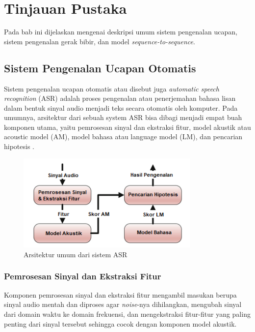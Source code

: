 \chapter{Tinjauan Pustaka}

Pada bab ini dijelaskan mengenai deskripsi umum sistem pengenalan ucapan, sistem pengenalan gerak bibir, dan model \textit{sequence-to-sequence}.

\section{Sistem Pengenalan Ucapan Otomatis}

Sistem pengenalan ucapan otomatis atau disebut juga \textit{automatic speech recognition} (ASR) adalah proses pengenalan atau penerjemahan bahasa lisan dalam bentuk sinyal audio menjadi teks secara otomatis oleh komputer. Pada umumnya, arsitektur dari sebuah system ASR bisa dibagi menjadi empat buah komponen utama, yaitu pemrosesan sinyal dan ekstraksi fitur, model akustik atau acoustic model (AM), model bahasa atau language model (LM), dan pencarian hipotesis \parencite{Yu2014}.

\begin{figure}[h]
    \centering
    \includegraphics[width=0.8\textwidth]{resources/images/arsitektur-umum-asr.png}
    \caption{Arsitektur umum dari sistem ASR \parencite{Yu2014}}
\end{figure}


\subsection{Pemrosesan Sinyal dan Ekstraksi Fitur}

Komponen pemrosesan sinyal dan ekstraksi fitur mengambil masukan berupa sinyal audio mentah dan diproses agar \textit{noise}-nya dihilangkan, mengubah sinyal dari domain waktu ke domain frekuensi, dan mengekstraksi fitur-fitur yang paling penting dari sinyal tersebut sehingga cocok dengan komponen model akustik.

